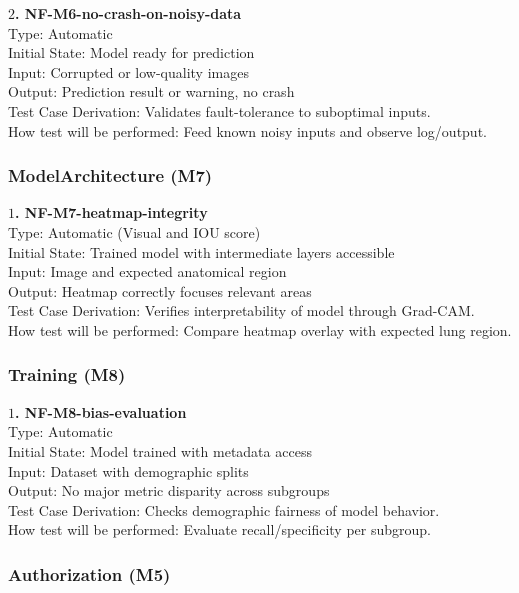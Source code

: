 \documentclass[12pt, titlepage]{article}
\begin{document}
\textbf{$2$. NF-M6-no-crash-on-noisy-data}\\
Type: Automatic\\
Initial State: Model ready for prediction\\
Input: Corrupted or low-quality images\\
Output: Prediction result or warning, no crash\\
Test Case Derivation: Validates fault-tolerance to suboptimal inputs.\\
How test will be performed: Feed known noisy inputs and observe log/output.

\subsubsection{ModelArchitecture (M7)}

\textbf{$1$. NF-M7-heatmap-integrity}\\
Type: Automatic (Visual and IOU score)\\
Initial State: Trained model with intermediate layers accessible\\
Input: Image and expected anatomical region\\
Output: Heatmap correctly focuses relevant areas\\
Test Case Derivation: Verifies interpretability of model through Grad-CAM.\\
How test will be performed: Compare heatmap overlay with expected lung region.

\subsubsection{Training (M8)}

\textbf{$1$. NF-M8-bias-evaluation}\\
Type: Automatic\\
Initial State: Model trained with metadata access\\
Input: Dataset with demographic splits\\
Output: No major metric disparity across subgroups\\
Test Case Derivation: Checks demographic fairness of model behavior.\\
How test will be performed: Evaluate recall/specificity per subgroup.

\subsubsection{Authorization (M5)}
\end{document}
